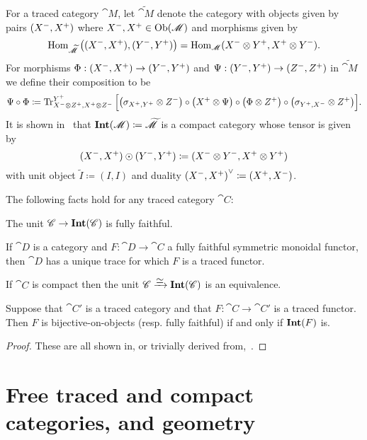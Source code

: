 \documentclass[11pt,oneside,article]{memoir}
\begin{document}
For a traced category $\cat{M}$, let $\widetilde{\cat{M}}$ denote the category with
objects given by pairs $(X^-,X^+)$ where $X^-,X^+\in \operatorname{Ob}(\mathscr{M})$ and morphisms
given by
\[
   \operatorname{Hom}_{\widetilde{\mathscr{M}}}\big((X^-,X^+),(Y^-,Y^+)\big)=\operatorname{Hom}_{\mathscr{M}}(X^-\otimes Y^+,X^+\otimes Y^-).
\]
For morphisms $\Phi:(X^-,X^+)\to(Y^-,Y^+)$ and $\Psi:(Y^-,Y^+)\to(Z^-,Z^+)$ in $\widetilde{\cat{M}}$ we define their composition to be
\[
   \Psi\circ\Phi\coloneqq\operatorname{Tr}^{Y^+}_{X^-\otimes Z^+,X^+\otimes Z^-}\Big[\big(\sigma_{X^+,Y^+}\otimes Z^-\big)\circ\big(X^+\otimes\Psi\big)\circ\big(\Phi\otimes Z^+\big)\circ\big(\sigma_{Y^+,X^-}\otimes Z^+\big)\Big].
\]
It is shown in~\cite{JoyalStreetVerity} that $\mathbf{Int}(\mathscr{M})\coloneqq\widetilde{\mathscr{M}}$ is a compact category whose tensor is given by
\[
   (X^-,X^+)\odot(Y^-,Y^+)\coloneqq(X^-\otimes Y^-,X^+\otimes Y^+)
\]
with unit object $\tilde I\coloneqq(I,I)$ and duality ${(X^-,X^+)}^\vee\coloneqq(X^+,X^-)$.

\begin{lemma}\label{lemma:fully_faithful_and_trace}
The following facts hold for any traced category $\cat{C}$:
\begin{compactenum}[\quad i.]
   \item The unit $\mathscr{C}\to\mathbf{Int}(\mathscr{C})$ is fully faithful.
   \item If $\cat{D}$ is a category and $F\colon\cat{D}\to\cat{C}$ a fully faithful symmetric
      monoidal functor, then $\cat{D}$ has a unique trace for which $F$ is a traced functor.
   \item If $\cat{C}$ is compact then the unit $\cat{C}\To{\raisebox{-1ex}{$\equiv$}}\Int(\cat{C})$ is an equivalence.
   \item Suppose that $\cat{C'}$ is a traced category and that $F\colon \cat{C}\to \cat{C}'$ is a
      traced functor. Then $F$ is bijective-on-objects (resp. fully faithful) if and only if
      $\mathbf{Int}(F)$ is.
\end{compactenum}
\end{lemma}
\begin{proof}
   These are all shown in, or trivially derived from,~\cite{JoyalStreetVerity}.
\end{proof}

\section{Free traced and compact categories, and geometry}\label{sec:free_and_geometry}
\end{document}
